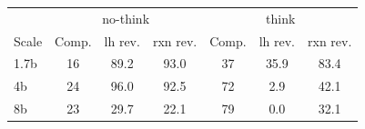 \begin{tabular}{lcccccc}
\toprule
& \multicolumn{3}{c}{no-think} & \multicolumn{3}{c}{think} \\
Scale & Comp. & lh rev. & rxn rev. & Comp. & lh rev. & rxn rev. \\
\midrule
1.7b & 16 & 89.2 & 93.0 & 37 & 35.9 & 83.4 \\
4b & 24 & 96.0 & 92.5 & 72 & 2.9 & 42.1 \\
8b & 23 & 29.7 & 22.1 & 79 & 0.0 & 32.1 \\
\bottomrule
\end{tabular}

